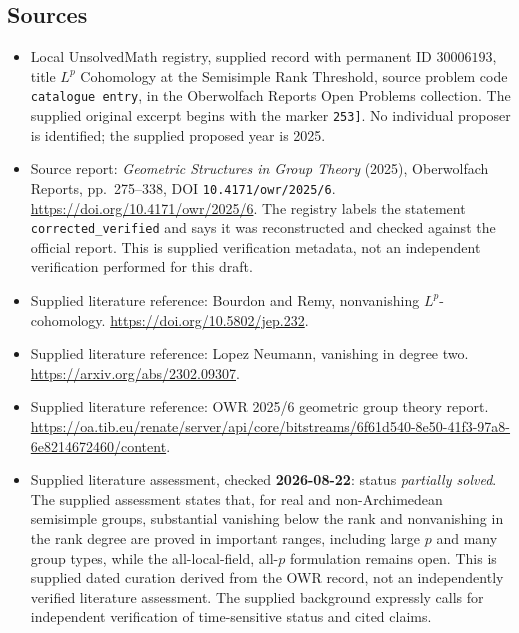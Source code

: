 \documentclass[11pt]{article}
\begin{document}
\subsection{Sources}
\begin{itemize}
\item Local UnsolvedMath registry, supplied record with permanent ID \(30006193\), title \(L^p\) Cohomology at the Semisimple Rank Threshold, source problem code \texttt{catalogue entry}, in the Oberwolfach Reports Open Problems collection. The supplied original excerpt begins with the marker \texttt{253]}. No individual proposer is identified; the supplied proposed year is 2025.
\item Source report: \emph{Geometric Structures in Group Theory} (2025), Oberwolfach Reports, pp.\ 275--338, DOI \texttt{10.4171/owr/2025/6}. \url{https://doi.org/10.4171/owr/2025/6}. The registry labels the statement \texttt{corrected\_verified} and says it was reconstructed and checked against the official report. This is supplied verification metadata, not an independent verification performed for this draft.
\item Supplied literature reference: Bourdon and Remy, nonvanishing \(L^p\)-cohomology. \url{https://doi.org/10.5802/jep.232}.
\item Supplied literature reference: Lopez Neumann, vanishing in degree two. \url{https://arxiv.org/abs/2302.09307}.
\item Supplied literature reference: OWR 2025/6 geometric group theory report. \url{https://oa.tib.eu/renate/server/api/core/bitstreams/6f61d540-8e50-41f3-97a8-6e8214672460/content}.
\item Supplied literature assessment, checked \textbf{2026-08-22}: status \emph{partially solved}. The supplied assessment states that, for real and non-Archimedean semisimple groups, substantial vanishing below the rank and nonvanishing in the rank degree are proved in important ranges, including large \(p\) and many group types, while the all-local-field, all-\(p\) formulation remains open. This is supplied dated curation derived from the OWR record, not an independently verified literature assessment. The supplied background expressly calls for independent verification of time-sensitive status and cited claims.
\end{itemize}
\end{document}
